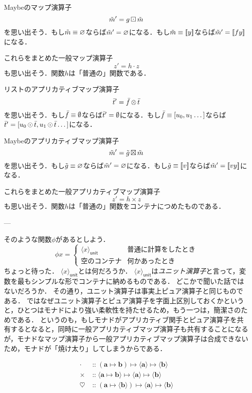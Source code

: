 \documentclass[twocolumn]{jsbook}
\def\[{[\![}
\def\]{]\!]}
\newcommand{\keyword}[1]{{\emph{#1}}}
\newcommand{\hsklType}[1]{\textbf{#1}}
\DeclareMathOperator{\hsklApplicativeMap}{\times}
\DeclareMathOperator{\hsklApplicativeListMap}{\otimes}
\DeclareMathOperator{\hsklApplicativeMaybeMap}{\boxtimes}
\DeclareMathOperator{\hsklFmap}{\cdot}
\DeclareMathOperator{\hsklMap}{\odot}
\DeclareMathOperator{\hsklMaybeMap}{\boxdot}
\DeclareMathOperator{\hsklMonadMap}{\heartsuit}
\newcommand{\hsklEmptyList}{\emptyset}
\newcommand{\hsklNothing}{\varnothing}
\newcommand{\hsklJust}[1]{\[#1\]}
\newcommand{\hsklList}[1]{\Bar{#1}}
\newcommand{\hsklMaybe}[1]{\Tilde{#1}}
\newcommand{\hsklPure}[1]{\langle#1\rangle_\textsf{pure}}
\newcommand{\hsklUnit}[1]{\langle#1\rangle_\textsf{unit}}
\DeclareMathOperator{\mathIn}{::}
\DeclareMathOperator{\mathMapsTo}{\mapsto}
\newcommand{\mathMorph}[2]{#1\mathMapsTo#2}
\newcommand{\mathMorphII}[3]{#1\mathMapsTo#2\mathMapsTo#3}
\begin{document}
Maybeのマップ演算子$$\hsklMaybe{m}'=g\hsklMaybeMap\hsklMaybe{m}$$を思い出そう．もし$\hsklMaybe{m}\equiv\hsklNothing$ならば$\hsklMaybe{m}'=\hsklNothing$になる．もし$\hsklMaybe{m}\equiv\hsklJust{y}$ならば$\hsklMaybe{m}'=\hsklJust{fy}$になる．

これらをまとめた一般マップ演算子$$z'=h\hsklFmap z$$も思い出そう．関数$h$は「普通の」関数である．

リストのアプリカティブマップ演算子$$\hsklList{t}'=\hsklList{f}\hsklApplicativeListMap\hsklList{t}$$を思い出そう．もし$\hsklList{f}\equiv\hsklEmptyList$ならば$\hsklList{t}'=\hsklEmptyList$になる．もし$\hsklList{f}\equiv[u_0,u_1\dots]$ならば$\hsklList{t}'=[u_0\hsklMap\hsklList{t},u_1\hsklMap\hsklList{t}\dots]$になる．

Maybeのアプリカティブマップ演算子$$\hsklMaybe{m}'=\hsklMaybe{g}\hsklApplicativeMaybeMap\hsklMaybe{m}$$を思い出そう．もし$\hsklMaybe{g}\equiv\hsklNothing$ならば$\hsklMaybe{m}'=\hsklNothing$になる．もし$\hsklMaybe{g}\equiv\hsklJust{v}$ならば$\hsklMaybe{m}'=\hsklJust{vy}$になる．

これらをまとめた一般アプリカティブマップ演算子$$z'=h\hsklApplicativeMap z$$も思い出そう．関数$h$は「普通の」関数をコンテナにつめたものである．


---

そのような関数$\phi$があるとしよう．
$$\phi x=\begin{cases}\hsklUnit{x}&\text{普通に計算をしたとき}\\
\text{空のコンテナ}&\text{何かあったとき}\end{cases}$$
ちょっと待った．
$\hsklUnit{x}$とは何だろうか．
$\hsklUnit{x}$は\keyword{ユニット演算子}と言って，変数を最もシンプルな形でコンテナに納めるものである．
どこかで聞いた話ではないだろうか．
その通り，ユニット演算子は事実上ピュア演算子と同じものである．
ではなぜユニット演算子とピュア演算子を字面上区別しておくかというと，ひとつはモナドにより強い柔軟性を持たせるため，もう一つは，簡潔さのためである．
というのも，もしモナドがアプリカティブ関手とピュア演算子を共有するとなると，同時に一般アプリカティブマップ演算子も共有することになるが，モナドなマップ演算子から一般アプリカティブマップ演算子は合成できないため，モナドが「焼け太り」してしまうからである．

\begin{align*}
\hsklFmap&\mathIn{}\mathMorphII{(\mathMorph{\hsklType{a}}{\hsklType{b}})}{\langle\hsklType{a}\rangle}{\langle\hsklType{b}
\rangle}\\
\hsklApplicativeMap&\mathIn{}\mathMorphII{\langle\mathMorph{\hsklType{a}}{\hsklType{b}}\rangle}{\langle\hsklType{a}\rangle}{\langle\hsklType{b}\rangle}\\
\hsklMonadMap&\mathIn{}\mathMorphII{(\mathMorph{\hsklType{a}}{\langle\hsklType{b}\rangle})}{\langle\hsklType{a}\rangle}{\langle{\hsklType{b}}\rangle}
\end{align*}
\end{document}
